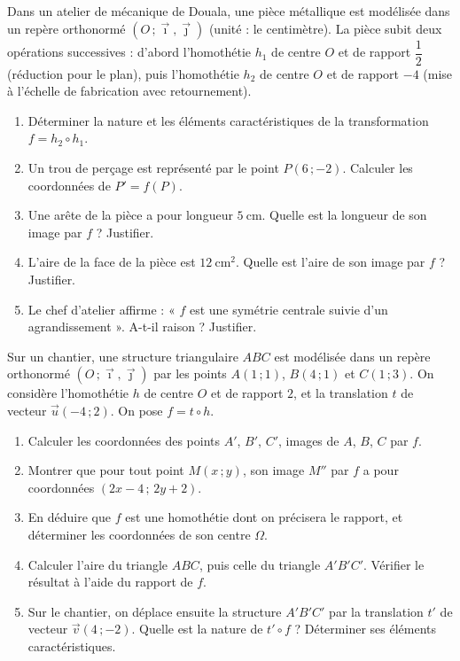 \documentclass[11pt]{article}
\begin{document}
\begin{exercice}
Dans un atelier de mécanique de Douala, une pièce métallique est modélisée dans un repère orthonormé $(O\,;\vec{\imath},\vec{\jmath})$ (unité : le centimètre). La pièce subit deux opérations successives : d'abord l'homothétie $h_1$ de centre $O$ et de rapport $\dfrac{1}{2}$ (réduction pour le plan), puis l'homothétie $h_2$ de centre $O$ et de rapport $-4$ (mise à l'échelle de fabrication avec retournement).
\begin{enumerate}
\item Déterminer la nature et les éléments caractéristiques de la transformation $f=h_2\circ h_1$.
\item Un trou de perçage est représenté par le point $P(6\,;-2)$. Calculer les coordonnées de $P'=f(P)$.
\item Une arête de la pièce a pour longueur $5\ \mathrm{cm}$. Quelle est la longueur de son image par $f$ ? Justifier.
\item L'aire de la face de la pièce est $12\ \mathrm{cm}^2$. Quelle est l'aire de son image par $f$ ? Justifier.
\item Le chef d'atelier affirme : « $f$ est une symétrie centrale suivie d'un agrandissement ». A-t-il raison ? Justifier.
\end{enumerate}
\end{exercice}

\begin{exercice}
Sur un chantier, une structure triangulaire $ABC$ est modélisée dans un repère orthonormé $(O\,;\vec{\imath},\vec{\jmath})$ par les points $A(1\,;1)$, $B(4\,;1)$ et $C(1\,;3)$. On considère l'homothétie $h$ de centre $O$ et de rapport $2$, et la translation $t$ de vecteur $\vec{u}(-4\,;2)$. On pose $f=t\circ h$.
\begin{enumerate}
\item Calculer les coordonnées des points $A'$, $B'$, $C'$, images de $A$, $B$, $C$ par $f$.
\item Montrer que pour tout point $M(x\,;y)$, son image $M''$ par $f$ a pour coordonnées $(2x-4\,;\,2y+2)$.
\item En déduire que $f$ est une homothétie dont on précisera le rapport, et déterminer les coordonnées de son centre $\Omega$.
\item Calculer l'aire du triangle $ABC$, puis celle du triangle $A'B'C'$. Vérifier le résultat à l'aide du rapport de $f$.
\item Sur le chantier, on déplace ensuite la structure $A'B'C'$ par la translation $t'$ de vecteur $\vec{v}(4\,;-2)$. Quelle est la nature de $t'\circ f$ ? Déterminer ses éléments caractéristiques.
\end{enumerate}
\end{exercice}
\end{document}

